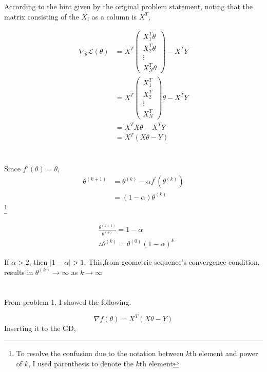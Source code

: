 \documentclass[10pt]{article}
\begin{document}
According to the hint given by the original problem statement, noting that the matrix consisting of the $X_i$ as a column is $X^T$,

\begin{align}
    \nabla_\theta \mathcal{L}(\theta) &= X^T \begin{pmatrix} X_1^T\theta \\ X_2^T\theta \\ \vdots \\ X_N^T\theta\end{pmatrix} - X^TY \\
    &= X^T\begin{pmatrix} X_1^T \\ X_2^T \\ \vdots \\ X_N^T\end{pmatrix}\theta - X^TY \\ &= X^TX\theta - X^TY \\ &= X^T(X\theta - Y) 
\end{align}


\section{}

Since $f'(\theta) = \theta$, 
\begin{align}
    \theta^{(k+1)} &= \theta^{(k)} - \alpha f^\prime(\theta^{(k)}) 
    \\ &= (1-\alpha) \theta^{(k)}
\end{align}
\footnote{To resolve the confusion due to the notation between $k$th element and power of $k$, I used parenthesis to denote the $k$th element}

\begin{align}
    &\frac{\theta^{(k+1)}}{\theta^{(k)}} = 1-\alpha \\
    &\therefore \theta^{(k)} = \theta^{(0)}(1-\alpha)^k
\end{align}

If $\alpha >2$, then $\left|1-\alpha\right|>1$. This,from geometric sequence's convergence condition, results in $\theta^{(k)} \rightarrow \infty $ as $k\rightarrow \infty$
\section{}

From problem 1, I showed the following. 

\begin{equation}
    \nabla f(\theta) = X^T(X\theta - Y)
\end{equation}
Inserting it to the GD,
\end{document}
